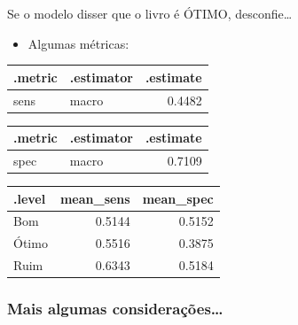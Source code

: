 \documentclass[
  9 pt,
  ignorenonframetext,
]{beamer}
\providecommand{\tightlist}{%
  \setlength{\itemsep}{0pt}\setlength{\parskip}{0pt}}
\begin{document}
\begin{frame}{Se o modelo disser que o livro é ÓTIMO, desconfie\ldots{}}
\begin{itemize}
\tightlist
\item
  Algumas métricas:
\end{itemize}

\begin{table}[H]
\centering
\begin{tabular}{llr}
\toprule
.metric & .estimator & .estimate\\
\midrule
sens & macro & 0.4482\\
\bottomrule
\end{tabular}
\end{table}

\begin{table}[H]
\centering
\begin{tabular}{llr}
\toprule
.metric & .estimator & .estimate\\
\midrule
spec & macro & 0.7109\\
\bottomrule
\end{tabular}
\end{table}

\begin{table}[H]
\centering
\begin{tabular}{lrr}
\toprule
.level & mean\_sens & mean\_spec\\
\midrule
Bom & 0.5144 & 0.5152\\
Ótimo & 0.5516 & 0.3875\\
Ruim & 0.6343 & 0.5184\\
\bottomrule
\end{tabular}
\end{table}
\end{frame}

\hypertarget{mais-algumas-considerauxe7uxf5es}{%
\subsubsection{Mais algumas
considerações\ldots{}}\label{mais-algumas-considerauxe7uxf5es}}
\end{document}
